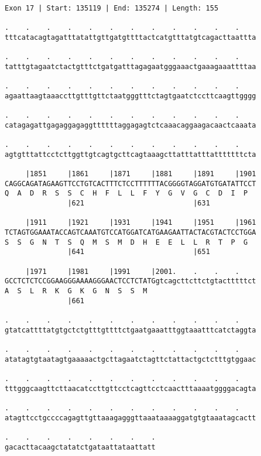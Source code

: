 \documentclass{article}
\begin{document}
\begin{Verbatim}
Exon 17 | Start: 135119 | End: 135274 | Length: 155
 
.    .    .    .    .    .    .    .    .    .    .    .    
tttcatacagtagatttatattgttgatgttttactcatgtttatgtcagacttaattta
  
.    .    .    .    .    .    .    .    .    .    .    .    
tatttgtagaatctactgtttctgatgatttagagaatgggaaactgaaagaaattttaa
  
.    .    .    .    .    .    .    .    .    .    .    .    
agaattaagtaaaccttgtttgttctaatgggtttctagtgaatctccttcaagttgggg
  
.    .    .    .    .    .    .    .    .    .    .    .    
catagagattgagaggagaggttttttaggagagtctcaaacaggaagacaactcaaata
  
.    .    .    .    .    .    .    .    .    .    .    .    
agtgtttattcctcttggttgtcagtgcttcagtaaagcttatttatttatttttttcta
  
     |1851     |1861     |1871     |1881     |1891     |1901
CAGGCAGATAGAAGTTCCTGTCACTTTCTCCTTTTTTACGGGGTAGGATGTGATATTCCT
Q  A  D  R  S  S  C  H  F  L  L  F  Y  G  V  G  C  D  I  P  
               |621                          |631           
  
     |1911     |1921     |1931     |1941     |1951     |1961
TCTAGTGGAAATACCAGTCAAATGTCCATGGATCATGAAGAATTACTACGTACTCCTGGA
S  S  G  N  T  S  Q  M  S  M  D  H  E  E  L  L  R  T  P  G  
               |641                          |651           
  
     |1971     |1981     |1991     |2001.    .    .    .    
GCCTCTCTCCGGAAGGGAAAAGGGAACTCCTCTATGgtcagcttcttctgtactttttct
A  S  L  R  K  G  K  G  N  S  S  M                          
               |661                                         
  
.    .    .    .    .    .    .    .    .    .    .    .    
gtatcattttatgtgctctgtttgttttctgaatgaaatttggtaaatttcatctaggta
  
.    .    .    .    .    .    .    .    .    .    .    .    
atatagtgtaatagtgaaaaactgcttagaatctagttctattactgctctttgtggaac
  
.    .    .    .    .    .    .    .    .    .    .    .    
tttgggcaagttcttaacatccttgttcctcagttcctcaactttaaaatggggacagta
  
.    .    .    .    .    .    .    .    .    .    .    .    
atagttcctgccccagagttgttaaagagggttaaataaaaggatgtgtaaatagcactt
  
.    .    .    .    .    .    .    .
gacacttacaagctatatctgataattataattatt
\end{Verbatim}
\end{document}
